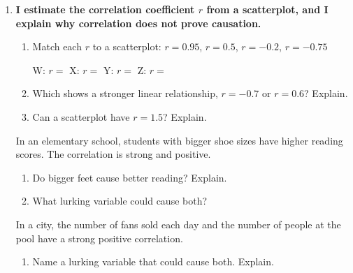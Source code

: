 \documentclass[11pt]{article}
\newcommand{\goal}[1]{\textbf{#1}\par\vspace{0.35em}}
\newcommand{\rblank}[1]{\underline{\makebox[0.6in]{\ans{#1}}}}
\begin{document}
\begin{enumerate}[resume]
\begin{enumerate}[start=5]
  \work{2.5em}
\end{enumerate}

\newpage
\item \goal{I estimate the correlation coefficient $r$ from a scatterplot, and I explain why correlation does not prove causation.}
\begin{enumerate}
  \item Match each $r$ to a scatterplot: \quad $r = 0.95$, \; $r = 0.5$, \; $r = -0.2$, \; $r = -0.75$

  \vspace{0.4em}
  \hspace*{-2em}

  \vspace{0.5em}
  W: $r =$ \rblank{0.5} \qquad X: $r =$ \rblank{$-0.75$} \qquad Y: $r =$ \rblank{0.95} \qquad Z: $r =$ \rblank{$-0.2$}
  \item Which shows a stronger linear relationship, $r = -0.7$ or $r = 0.6$? Explain.

  \work{2.5em}
  \item Can a scatterplot have $r = 1.5$? Explain.

  \work{2em}
\end{enumerate}

\vspace{0.6em}
In an elementary school, students with bigger shoe sizes have higher reading scores. The correlation is strong and positive.
\begin{enumerate}[start=4]
  \item Do bigger feet cause better reading? Explain.

  \work{2.5em}
  \item What lurking variable could cause both?

  \work{2.5em}
\end{enumerate}

\vspace{0.6em}
In a city, the number of fans sold each day and the number of people at the pool have a strong positive correlation.
\begin{enumerate}[start=6]
  \item Name a lurking variable that could cause both. Explain.

  \work{2.5em}
\end{enumerate}

\end{enumerate}
\end{document}
